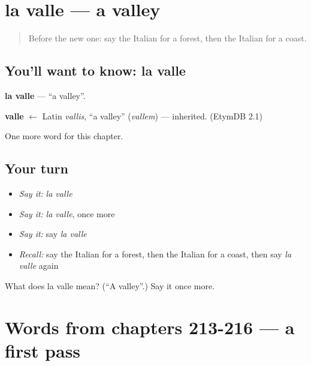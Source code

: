 \section[la valle]{la valle — a valley}

\label{lesson:IT-C221-valle}



\begin{quote}
Before the new one: say the Italian for a forest, then the Italian for a coast.
\end{quote}

\subsection*{You'll want to know: la valle}
\textbf{la valle} — \textquotedblleft{}a valley\textquotedblright{}.

\begin{cousinweb}
\textbf{valle} $\leftarrow$ Latin \emph{vallis}, \textquotedblleft{}a valley\textquotedblright{} (\emph{vallem}) — inherited. (EtymDB 2.1)
\end{cousinweb}

\begin{grammarlens}[title={What you've built}]
One more word for this chapter.
\end{grammarlens}

\subsection*{Your turn}
\begin{itemize}
\raggedright
  \item \emph{Say it:} \emph{la valle}
  \item \emph{Say it:} \emph{la valle}, once more
  \item \emph{Say it:} say \emph{la valle}
  \item \emph{Recall:} say the Italian for a forest, then the Italian for a coast, then say \emph{la valle} again
\end{itemize}

\begin{tcolorbox}[breakable,colback=teal!4,colframe=teal!35!black,title={Before you move on}]
What does la valle mean? (\textquotedblleft{}A valley\textquotedblright{}.) Say it once more.
\end{tcolorbox}
\section[(dialogue)]{Words from chapters 213-216 — a first pass}

